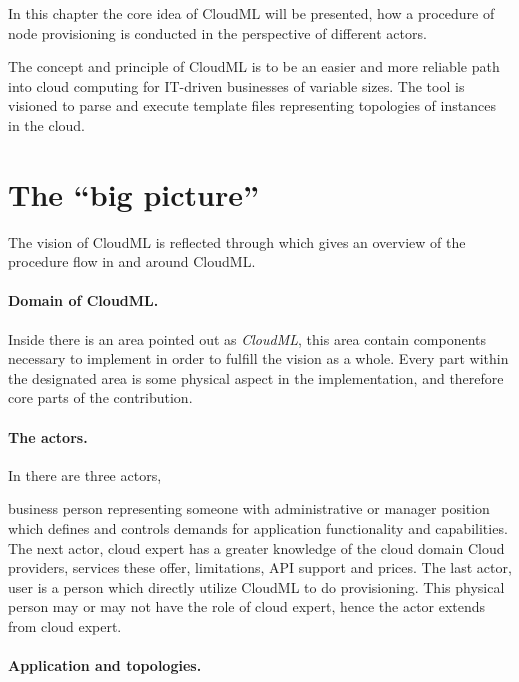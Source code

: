 

In this chapter the core idea of CloudML will be presented,
how a procedure of node provisioning is conducted in the perspective of different actors.

The concept and principle of CloudML is to be an easier and more reliable
path into cloud computing for IT-driven businesses of variable sizes.
The tool is visioned to parse and execute template files representing topologies
of instances in the cloud. 

\section{The ``big picture''}

The vision of CloudML is reflected through  which gives
an overview of the procedure flow in and around CloudML.

\paragraph{Domain of CloudML.}

Inside  there is an area pointed out as \emph{CloudML},
this area contain components necessary to implement in order to fulfill
the vision as a whole.
Every part within the designated area is some physical aspect in the 
implementation, and therefore core parts of the contribution.

\paragraph{The actors.}

In  there are three actors,
\begin{ii}
  \iitem business person representing someone with administrative or manager position which
    defines and controls demands for application functionality and capabilities.
    The next actor,
  \iitem cloud expert has a greater knowledge of the cloud domain \eg Cloud providers,
    services these offer, limitations, API support and prices.
    The last actor,
  \iitem user is a person which directly utilize CloudML to do provisioning.
    This physical person may or may not have the role of cloud expert, hence 
    the actor extends from cloud expert.
\end{ii}

\paragraph{Application and topologies.}

